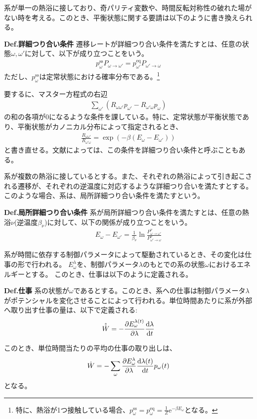 \documentclass[a4paper,11pt]{jsarticle}
\numberwithin{equation}{section}
\begin{document}
系が単一の熱浴に接しており、奇パリティ変数や、時間反転対称性の破れた場がない時を考える。このとき、平衡状態に関する要請は以下のように書き換えられる。
\begin{itembox}[l]{\textbf{Def.詳細つり合い条件}}
    遷移レートが詳細つり合い条件を満たすとは、任意の状態$\omega,\omega'$に対して、以下が成り立つことをいう。
    \begin{align}
      p_{\omega}^{\text{ss}} P_{\omega \to \omega'} = p_{\omega'}^{\text{eq}} P_{\omega' \to \omega}
    \end{align}
    ただし、$p_{\omega}^{\text{ss}}$は定常状態における確率分布である。\footnote{
      特に、熱浴が1つ接触している場合、$p_{\omega}^{\text{ss}} = p_{\omega}^{\text{eq}}=\frac{1}{Z} \mathrm{e}^{-\beta E_{\omega}}$となる。
    }
\end{itembox}
要するに、マスター方程式の右辺
\begin{align}
  \sum_{\omega'} (R_{\omega \omega'} p_{\omega'} - R_{\omega' \omega} p_{\omega}) 
\end{align}
の和の各項が0になるような条件を課している。特に、定常状態が平衡状態であり、平衡状態がカノニカル分布によって指定されるとき、
\begin{align}
  \frac{R_{\omega \omega'}}{R_{\omega' \omega}} = \exp(-\beta (E_{\omega} - E_{\omega'}))
\end{align}
と書き直せる。文献によっては、この条件を詳細つり合い条件と呼ぶこともある。

系が複数の熱浴に接しているとする。また、それぞれの熱浴によって引き起こされる遷移が、それぞれの逆温度に対応するような詳細つり合いを満たすとする。
このような場合、系は、局所詳細つり合い条件を満たすという。
\begin{itembox}[l]{\textbf{Def.局所詳細つり合い条件}}
    系が局所詳細つり合い条件を満たすとは、任意の熱浴$\nu$(逆温度$\beta_{\nu}$)に対して、以下の関係が成り立つことをいう。
    \begin{align}
      E_{\omega} - E_{\omega'} = \frac{1}{\beta_{\nu}} \ln \frac{P_{\omega \to \omega'}^{\nu}}{P_{\omega' \to \omega}^{\nu}}
    \end{align}
\end{itembox}

系が時間に依存する制御パラメータによって駆動されているとき、その変化は仕事の形で行われる。
$E_{\omega}^{\lambda}$を、制御パラメータ$\lambda$のもとでの系の状態$\omega$におけるエネルギーとする。
このとき、仕事は以下のように定義される。
  \begin{itembox}[l]{\textbf{Def.仕事}}
    系の状態が$\omega$であるとする。このとき、系への仕事は制御パラメータ$\lambda$がポテンシャルを変化させることによって行われる。単位時間あたりに系が外部へ取り出す仕事の量は、以下で定義される:
    \begin{align}
      \hat{\dot{W}} = -\pdv{E^{\lambda(t)}_{\omega}}{\lambda}\dv{\lambda}{t}
    \end{align}
  \end{itembox}
このとき、単位時間当たりの平均の仕事の取り出しは、
    \begin{align}
        \dot{W} = -\sum_{\omega} \pdv{E^{\lambda}_{\omega}}{\lambda}\dv{\lambda(t)}{t} p_{\omega}(t)
    \end{align}
    となる。
\end{document}
